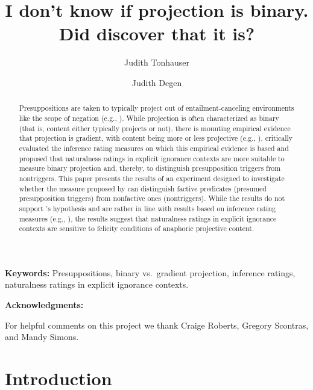 \documentclass[11pt,fleqn]{article}
\title{I don't know if projection is binary. \\ Did \citealt{mandelkern-etal2020} discover that it is?}
\author[$\circ$]{Judith Tonhauser}
\author[$\bullet$]{Judith Degen}
\affil[$\circ$]{University of Stuttgart}
\affil[$\bullet$]{Stanford University}
\newcommand{\6}{\mbox{$[\hspace*{-.6mm}[$}}
\newcommand{\9}{\mbox{$]\hspace*{-.6mm}]$}}
\newcommand{\citepos}[1]{\citeauthor{#1}'s \citeyear{#1}}
\begin{document}
\maketitle


\begin{abstract}

Presuppositions are taken to typically project out of entailment-canceling environments like the scope of negation (e.g., \citealt{frege1892,ccmg90}). While projection is often characterized as binary (that is, content either typically projects or not), there is mounting empirical evidence that projection is gradient, with content being more or less projective (e.g., \citealt{karttunen71b,xue-onea11,demarneffe-etal-sub23,tbd-variability,degen-tonhauser-language}). \citealt{mandelkern-etal2020} critically evaluated the inference rating measures on which this empirical evidence is based and proposed that naturalness ratings in explicit ignorance contexts are more suitable to measure binary projection and, thereby, to distinguish presupposition triggers from nontriggers. This paper presents the results of an experiment designed to investigate whether the measure proposed by \citealt{mandelkern-etal2020} can distinguish factive predicates (presumed presupposition triggers) from nonfactive ones (nontriggers). While the results do not support \citepos{mandelkern-etal2020} hypothesis and are rather in line with results based on inference rating measures (e.g., \citealt{degen-tonhauser-language}), the results suggest that naturalness ratings in explicit ignorance contexts are sensitive to felicity conditions of anaphoric projective content.

\end{abstract}

\bigskip

\noindent
{\bf Keywords:} Presuppositions, binary vs.\ gradient projection, inference ratings, naturalness ratings in explicit ignorance contexts. 

\bigskip

\noindent
{\bf Acknowledgments:} 

\noindent
For helpful comments on this project we thank Craige Roberts, Gregory Scontras, and Mandy Simons.

\newpage
		
\section{Introduction}\label{s1}
\end{document}
